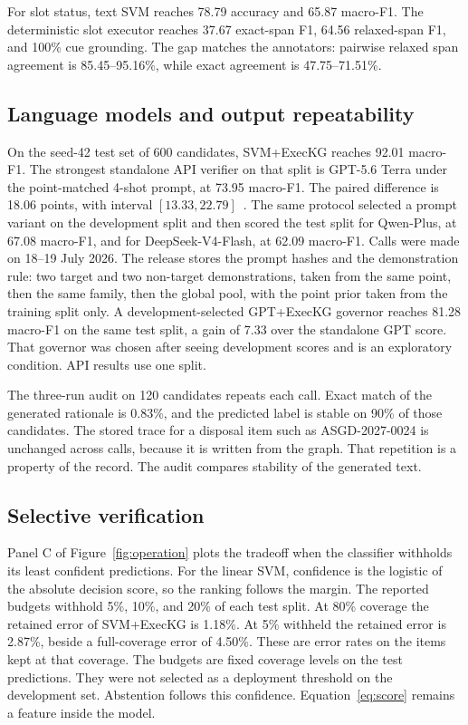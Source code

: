 \documentclass[pdflatex,sn-mathphys,NameDate]{sn-jnl}
\begin{document}
For slot status, text SVM reaches 78.79 accuracy and 65.87 macro-F1.
The deterministic slot executor reaches 37.67 exact-span F1, 64.56 relaxed-span F1, and 100\% cue grounding.
The gap matches the annotators: pairwise relaxed span agreement is 85.45--95.16\%, while exact agreement is 47.75--71.51\%.

\subsection{Language models and output repeatability}

On the seed-42 test set of 600 candidates, SVM+ExecKG reaches 92.01 macro-F1.
The strongest standalone API verifier on that split is GPT-5.6 Terra under the point-matched 4-shot prompt, at 73.95 macro-F1.
The paired difference is 18.06 points, with interval $[13.33, 22.79]$~\citep{openai2026,alibaba2026,deepseek2026}.
The same protocol selected a prompt variant on the development split and then scored the test split for Qwen-Plus, at 67.08 macro-F1, and for DeepSeek-V4-Flash, at 62.09 macro-F1.
Calls were made on 18--19 July 2026.
The release stores the prompt hashes and the demonstration rule: two target and two non-target demonstrations, taken from the same point, then the same family, then the global pool, with the point prior taken from the training split only.
A development-selected GPT+ExecKG governor reaches 81.28 macro-F1 on the same test split, a gain of 7.33 over the standalone GPT score.
That governor was chosen after seeing development scores and is an exploratory condition.
API results use one split.

The three-run audit on 120 candidates repeats each call.
Exact match of the generated rationale is 0.83\%, and the predicted label is stable on 90\% of those candidates.
The stored trace for a disposal item such as ASGD-2027-0024 is unchanged across calls, because it is written from the graph.
That repetition is a property of the record.
The audit compares stability of the generated text.

\subsection{Selective verification}

Panel C of Figure~\ref{fig:operation} plots the tradeoff when the classifier withholds its least confident predictions.
For the linear SVM, confidence is the logistic of the absolute decision score, so the ranking follows the margin.
The reported budgets withhold 5\%, 10\%, and 20\% of each test split.
At 80\% coverage the retained error of SVM+ExecKG is 1.18\%.
At 5\% withheld the retained error is 2.87\%, beside a full-coverage error of 4.50\%.
These are error rates on the items kept at that coverage.
The budgets are fixed coverage levels on the test predictions.
They were not selected as a deployment threshold on the development set.
Abstention follows this confidence.
Equation~\ref{eq:score} remains a feature inside the model.
\end{document}
